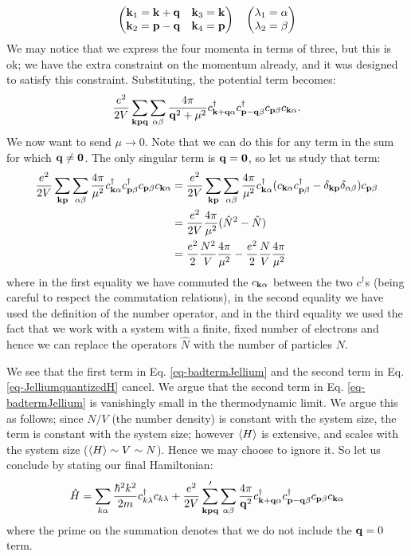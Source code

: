 \begin{equation}
    \begin{pmatrix}\mathbf{k}_1 = \mathbf{k} + \mathbf{q} & \mathbf{k}_3 = \mathbf{k} \\ \mathbf{k}_2 = \mathbf{p} - \mathbf{q} & \mathbf{k}_4 = \mathbf{p}\end{pmatrix} \quad \begin{pmatrix}\lambda_1 = \alpha \\ \lambda_2 = \beta\end{pmatrix}
\end{equation}
We may notice that we express the four momenta in terms of three, but this is ok; we have the extra constraint on the momentum already, and it was designed to satisfy this constraint. Substituting, the potential term becomes:
\begin{equation}
    \frac{e^2}{2V}\sum_{\mathbf{k}\mathbf{p}\mathbf{q}}\sum_{\alpha\beta}\frac{4\pi}{\mathbf{q}^2 + \mu^2}c^\dagger_{\mathbf{k} + \mathbf{q}\alpha}c^{\dagger}_{\mathbf{p} - \mathbf{q}\beta}c_{\mathbf{p}\beta}c_{\mathbf{k}\alpha}.
\end{equation}
We now want to send $\mu \to 0$. Note that we can do this for any term in the sum for which $\mathbf{q} \neq \mathbf{0}$. The only singular term is $\mathbf{q} = \mathbf{0}$, so let us study that term:
\begin{equation}\label{eq-badtermJellium}
    \begin{split}
        \frac{e^2}{2V}\sum_{\mathbf{k}\mathbf{p}}\sum_{\alpha\beta}\frac{4\pi}{\mu^2}c^\dagger_{\mathbf{k}\alpha}c^{\dagger}_{\mathbf{p}\beta}c_{\mathbf{p}\beta}c_{\mathbf{k}\alpha} &= \frac{e^2}{2V}\sum_{\mathbf{k}\mathbf{p}}\sum_{\alpha\beta}\frac{4\pi}{\mu^2}c^\dagger_{\mathbf{k}\alpha}(c_{\mathbf{k}\alpha}c^\dagger_{\mathbf{p}\beta} - \delta_{\mathbf{k}\mathbf{p}}\delta_{\alpha\beta})c_{\mathbf{p}\beta}
        \\ &= \frac{e^2}{2V}\frac{4\pi}{\mu^2}(\hat{N}^2 - \hat{N})
        \\ &=\frac{e^2}{2}\frac{N^2}{V}\frac{4\pi}{\mu^2} - \frac{e^2}{2}\frac{N}{V}\frac{4\pi}{\mu^2}
    \end{split}
\end{equation}
where in the first equality we have commuted the $c_{\mathbf{k}\alpha}$ between the two $c^\dag$s (being careful to respect the commutation relations), in the second equality we have used the definition of the number operator, and in the third equality we used the fact that we work with a system with a finite, fixed number of electrons and hence we can replace the operators $\hat{N}$ with the number of particles $N$. 

We see that the first term in Eq. \eqref{eq-badtermJellium} and the second term in Eq. \eqref{eq-JelliumquantizedH} cancel. We argue that the second term in Eq. \eqref{eq-badtermJellium} is vanishingly small in the thermodynamic limit. We argue this as follows; since $N/V$ (the number density) is constant with the system size, the term is constant with the system size; however $\left< H \right>$ is extensive, and scales with the system size ($\left< H \right> \sim V \sim N$). Hence we may choose to ignore it. So let us conclude by stating our final Hamiltonian:
\begin{equation}
    \hat{H} = \sum_{k\alpha}\frac{\hbar^2k^2}{2m}c^\dagger_{k\lambda}c_{k\lambda} + \frac{e^2}{2V}\sum_{\mathbf{k}\mathbf{p}\mathbf{q}}'\sum_{\alpha\beta} \frac{4\pi}{\mathbf{q}^2}c^\dagger_{\mathbf{k} + \mathbf{q}\alpha}c^{\dagger}_{\mathbf{p} - \mathbf{q}\beta}c_{\mathbf{p}\beta}c_{\mathbf{k}\alpha}
\end{equation}
where the prime on the summation denotes that we do not include the $\mathbf{q} = 0$ term.